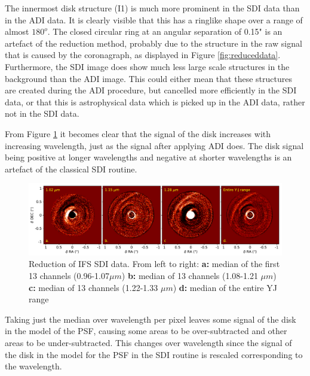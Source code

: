 \documentclass[twoside,single,12pt]{lion-msc}
\begin{document}
The innermost disk structure (I1) is much more prominent in the SDI data than in the ADI data. It is clearly visible that this has a ringlike shape over a range of almost $180^o$. The closed circular ring at an angular separation of 0.15" is an artefact of the reduction method, probably due to the structure in the raw signal that is caused by the coronagraph, as displayed in Figure \ref{fig:reduceddata}. Furthermore, the SDI image does show much less large scale structures in the background than the ADI image. This could either mean that these structures are created during the ADI procedure, but cancelled more efficiently in the SDI data, or that this is astrophysical data which is picked up in the ADI data, rather not in the SDI data.
\bigskip

From Figure \ref{fig:SDIcolor} it becomes clear that the signal of the disk increases with increasing wavelength, just as the signal after applying ADI does. The disk signal being positive at longer wavelengths and negative at shorter wavelengths is an artefact of the classical SDI routine. {\par}

\begin{figure}[htb]
\centering
\includegraphics[trim={0cm 0cm 0cm 0cm},clip,width = \textwidth]{SDIwavelplot}
\caption{Reduction of IFS SDI data. From left to right: \textbf{a:} median of the first 13 channels (0.96-1.07$\mu m$) \textbf{b:} median of 13 channels (1.08-1.21 $\mu m$) \textbf{c:} median of 13 channels (1.22-1.33 $\mu m$) \textbf{d:} median of the entire YJ range}
\label{fig:SDIcolor}
\end{figure}

\noindent
Taking just the median over wavelength per pixel leaves some signal of the disk in the model of the PSF, causing some areas to be over-subtracted and other areas to be under-subtracted. This changes over wavelength since the signal of the disk in the model for the PSF in the SDI routine is rescaled corresponding to the wavelength.
\clearpage
\end{document}

